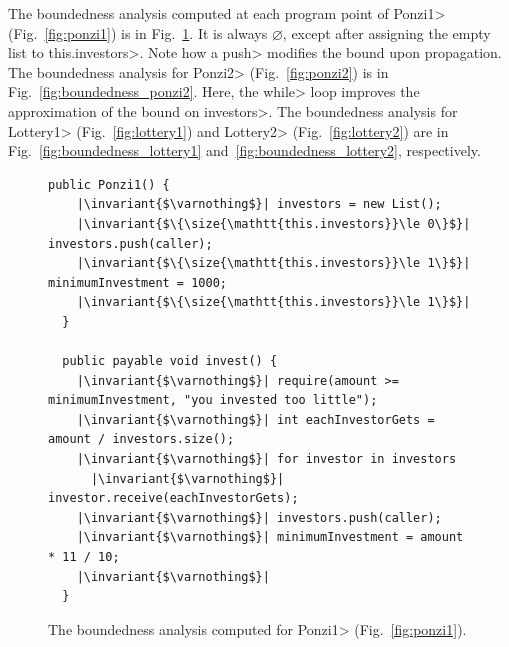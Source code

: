 \begin{example}\label{ex:boundedness_computation}
  The boundedness analysis computed at each program point
  of \<Ponzi1> (Fig.~\ref{fig:ponzi1}) is in Fig.~\ref{fig:boundedness_ponzi1}.
  It is always $\varnothing$, except after assigning
  the empty list to \<this.investors>. Note how a \<push> modifies the
  bound upon propagation. The boundedness analysis for \<Ponzi2> (Fig.~\ref{fig:ponzi2})
  is in Fig.~\ref{fig:boundedness_ponzi2}. Here, the \<while> loop
  improves the approximation of the bound on \<investors>.
  The boundedness analysis for \<Lottery1> (Fig.~\ref{fig:lottery1})
  and \<Lottery2> (Fig.~\ref{fig:lottery2})
  are in Fig.~\ref{fig:boundedness_lottery1} and~\ref{fig:boundedness_lottery2},
  respectively.

  \begin{figure}[t]
    \begin{lstlisting}[language=pseudo,numbers=none]
  public Ponzi1() {
    |\invariant{$\varnothing$}| investors = new List();
    |\invariant{$\{\size{\mathtt{this.investors}}\le 0\}$}| investors.push(caller);
    |\invariant{$\{\size{\mathtt{this.investors}}\le 1\}$}| minimumInvestment = 1000;
    |\invariant{$\{\size{\mathtt{this.investors}}\le 1\}$}|
  }

  public payable void invest() {
    |\invariant{$\varnothing$}| require(amount >= minimumInvestment, "you invested too little");
    |\invariant{$\varnothing$}| int eachInvestorGets = amount / investors.size();
    |\invariant{$\varnothing$}| for investor in investors
      |\invariant{$\varnothing$}| investor.receive(eachInvestorGets);
    |\invariant{$\varnothing$}| investors.push(caller);
    |\invariant{$\varnothing$}| minimumInvestment = amount * 11 / 10;
    |\invariant{$\varnothing$}|
  }
    \end{lstlisting}
    \caption{The boundedness analysis computed for \<Ponzi1> (Fig.~\ref{fig:ponzi1}).}
    \label{fig:boundedness_ponzi1}
  \end{figure}


\end{example}

